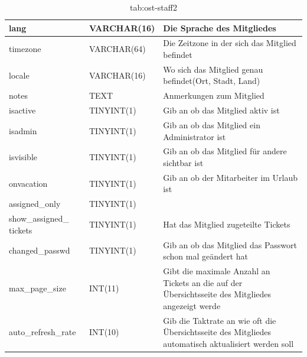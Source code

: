 		\begin{table}[h]
			\begin{tabular}{|p{3.5cm}|p{4cm}|p{6.2cm}|}
				\hline
		lang & VARCHAR(16) & Die Sprache des Mitgliedes \\
		\hline
		timezone & VARCHAR(64) & Die Zeitzone in der sich das Mitglied befindet \\
		\hline
		locale & VARCHAR(16)& Wo sich das Mitglied genau befindet(Ort, Stadt, Land) \\
		\hline
		notes & TEXT & Anmerkungen zum Mitglied\\
		\hline
		isactive & TINYINT(1) & Gib an ob das Mitglied aktiv ist\\
		\hline
		isadmin & TINYINT(1) & Gib an ob das Mitglied ein Administrator ist\\
		\hline
		isvisible & TINYINT(1) & Gib an ob das Mitglied für andere sichtbar ist \\
		\hline
		onvacation & TINYINT(1) & Gib an ob der Mitarbeiter im Urlaub ist \\
		\hline
		assigned\_only & TINYINT(1) & \\
		\hline
		show\_assigned\_ tickets & TINYINT(1) & Hat das Mitglied zugeteilte Tickets \\
		\hline
		changed\_passwd & TINYINT(1) & Gib an ob das Mitglied das Passwort schon mal geändert hat\\
		\hline
		max\_page\_size & INT(11) & Gibt die maximale Anzahl an Tickets an die auf der Übersichtsseite des Mitgliedes angezeigt werde \\
		\hline
		auto\_refresh\_rate & INT(10) & Gib die Taktrate an wie oft die Übersichtsseite des Mitgliedes automatisch aktualisiert werden soll \\
		\hline
	\end{tabular}
	\caption{tab:ost-staff2}
\end{table}
\label{tab:ost_staff2}

\newpage

